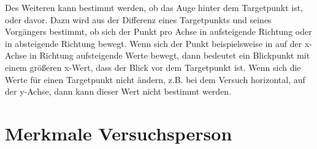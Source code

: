 Des Weiteren kann bestimmt werden, ob das Auge hinter dem Targetpunkt ist, oder davor. Dazu wird aus der Differenz eines Targetpunkts und seines Vorg\"angers bestimmt, ob sich der Punkt pro Achse in aufsteigende Richtung oder in absteigende Richtung bewegt. Wenn sich der Punkt beispielsweise in auf der x-Achse in Richtung aufsteigende Werte bewegt, dann bedeutet ein Blickpunkt mit einem gr\"o\ss{}eren x-Wert, dass der Blick vor dem Targetpunkt ist.
Wenn sich die Werte f\"ur einen Targetpunkt nicht \"andern, z.B. bei dem Versuch horizontal, auf der y-Achse, dann kann dieser Wert nicht bestimmt werden.

\section{Merkmale Versuchsperson}